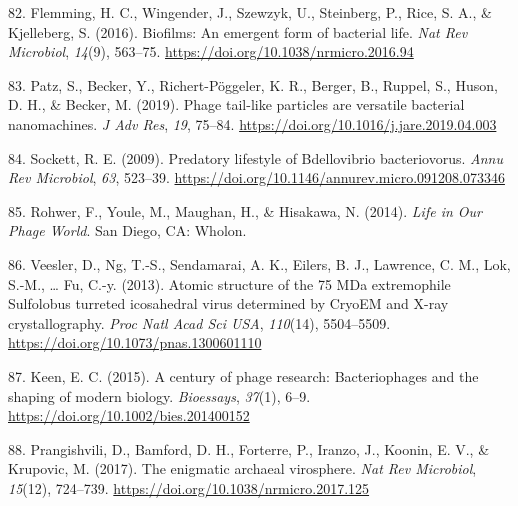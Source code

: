 \documentclass[]{tufte-book}
\begin{document}
\leavevmode\hypertarget{ref-flemming2016}{}%
82. Flemming, H. C., Wingender, J., Szewzyk, U., Steinberg, P., Rice, S. A., \& Kjelleberg, S. (2016). Biofilms: An emergent form of bacterial life. \emph{Nat Rev Microbiol}, \emph{14}(9), 563--75. \url{https://doi.org/10.1038/nrmicro.2016.94}

\leavevmode\hypertarget{ref-patz2019}{}%
83. Patz, S., Becker, Y., Richert-Pöggeler, K. R., Berger, B., Ruppel, S., Huson, D. H., \& Becker, M. (2019). Phage tail-like particles are versatile bacterial nanomachines. \emph{J Adv Res}, \emph{19}, 75--84. \url{https://doi.org/10.1016/j.jare.2019.04.003}

\leavevmode\hypertarget{ref-sockett2009}{}%
84. Sockett, R. E. (2009). Predatory lifestyle of Bdellovibrio bacteriovorus. \emph{Annu Rev Microbiol}, \emph{63}, 523--39. \url{https://doi.org/10.1146/annurev.micro.091208.073346}

\leavevmode\hypertarget{ref-rohwer2014}{}%
85. Rohwer, F., Youle, M., Maughan, H., \& Hisakawa, N. (2014). \emph{Life in Our Phage World}. San Diego, CA: Wholon.

\leavevmode\hypertarget{ref-veesler2013}{}%
86. Veesler, D., Ng, T.-S., Sendamarai, A. K., Eilers, B. J., Lawrence, C. M., Lok, S.-M., \ldots{} Fu, C.-y. (2013). Atomic structure of the 75 MDa extremophile Sulfolobus turreted icosahedral virus determined by CryoEM and X-ray crystallography. \emph{Proc Natl Acad Sci USA}, \emph{110}(14), 5504--5509. \url{https://doi.org/10.1073/pnas.1300601110}

\leavevmode\hypertarget{ref-keen2015}{}%
87. Keen, E. C. (2015). A century of phage research: Bacteriophages and the shaping of modern biology. \emph{Bioessays}, \emph{37}(1), 6--9. \url{https://doi.org/10.1002/bies.201400152}

\leavevmode\hypertarget{ref-prangishvili2017}{}%
88. Prangishvili, D., Bamford, D. H., Forterre, P., Iranzo, J., Koonin, E. V., \& Krupovic, M. (2017). The enigmatic archaeal virosphere. \emph{Nat Rev Microbiol}, \emph{15}(12), 724--739. \url{https://doi.org/10.1038/nrmicro.2017.125}
\end{document}
